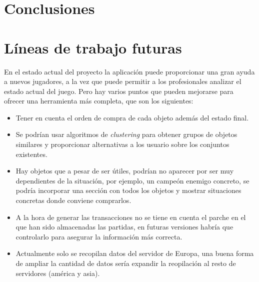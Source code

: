 
\section{Conclusiones}


\section{Líneas de trabajo futuras}
En el estado actual del proyecto la aplicación puede proporcionar una gran ayuda a nuevos jugadores, a la vez que puede permitir a los profesionales analizar el estado actual del juego. Pero hay varios puntos que pueden mejorarse para ofrecer una herramienta más completa, que son los siguientes:
\begin{itemize}
	\item Tener en cuenta el orden de compra de cada objeto además del estado final.
	\item Se podrían usar algoritmos de \textit{clustering} para obtener grupos de objetos similares y proporcionar alternativas a los usuario sobre los conjuntos existentes.
	\item Hay objetos que a pesar de ser útiles, podrían no aparecer por ser muy dependientes de la situación, por ejemplo, un campeón enemigo concreto, se podría incorporar una sección con todos los objetos y mostrar situaciones concretas donde conviene comprarlos.
	\item A la hora de generar las transacciones no se tiene en cuenta el parche en el que han sido almacenadas las partidas, en futuras versiones habría que controlarlo para asegurar la información más correcta.
	\item Actualmente solo se recopilan datos del servidor de Europa, una buena forma de ampliar la cantidad de datos sería expandir la reopilación al resto de servidores (américa y asia).
\end{itemize}